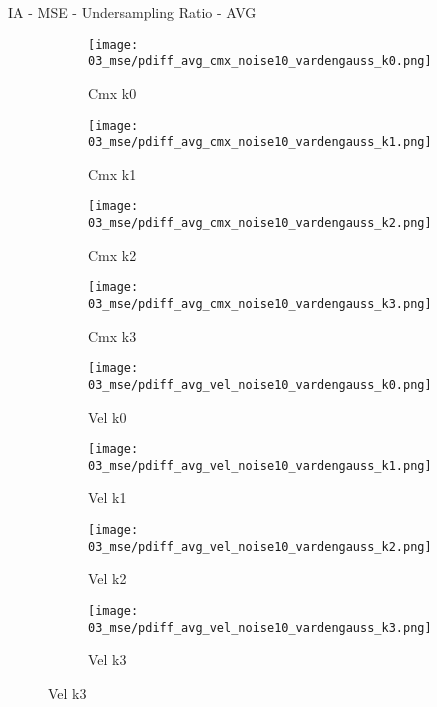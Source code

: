 \documentclass{beamer}
\begin{document}
\begin{frame}{IA - MSE - Undersampling Ratio - AVG}{}
\begin{figure}
\begin{subfigure}{0.24\textwidth}
\texttt{[image: 03\_mse/pdiff\_avg\_cmx\_noise10\_vardengauss\_k0.png]}
\vspace{-20pt}
\caption*{\tiny Cmx k0}
\end{subfigure}
\begin{subfigure}{0.24\textwidth}
\texttt{[image: 03\_mse/pdiff\_avg\_cmx\_noise10\_vardengauss\_k1.png]}
\vspace{-20pt}
\caption*{\tiny Cmx k1}
\end{subfigure}
\begin{subfigure}{0.24\textwidth}
\texttt{[image: 03\_mse/pdiff\_avg\_cmx\_noise10\_vardengauss\_k2.png]}
\vspace{-20pt}
\caption*{\tiny Cmx k2}
\end{subfigure}
\begin{subfigure}{0.24\textwidth}
\texttt{[image: 03\_mse/pdiff\_avg\_cmx\_noise10\_vardengauss\_k3.png]}
\vspace{-20pt}
\caption*{\tiny Cmx k3}
\end{subfigure}

\begin{subfigure}{0.24\textwidth}
\texttt{[image: 03\_mse/pdiff\_avg\_vel\_noise10\_vardengauss\_k0.png]}
\vspace{-20pt}
\caption*{\tiny Vel k0}
\end{subfigure}
\begin{subfigure}{0.24\textwidth}
\texttt{[image: 03\_mse/pdiff\_avg\_vel\_noise10\_vardengauss\_k1.png]}
\vspace{-20pt}
\caption*{\tiny Vel k1}
\end{subfigure}
\begin{subfigure}{0.24\textwidth}
\texttt{[image: 03\_mse/pdiff\_avg\_vel\_noise10\_vardengauss\_k2.png]}
\vspace{-20pt}
\caption*{\tiny Vel k2}
\end{subfigure}
\begin{subfigure}{0.24\textwidth}
\texttt{[image: 03\_mse/pdiff\_avg\_vel\_noise10\_vardengauss\_k3.png]}
\vspace{-20pt}
\caption*{\tiny Vel k3}
\end{subfigure}
\end{figure}
\end{frame}
\end{document}
